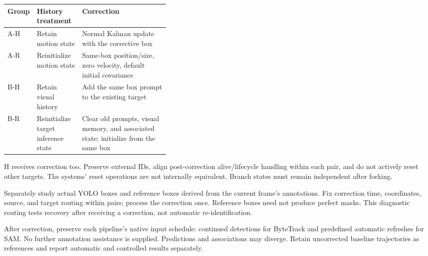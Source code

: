 \documentclass{article}
\begin{document}
\begin{center}
\begin{tabularx}{\linewidth}{@{}p{0.10\linewidth}p{0.28\linewidth}X@{}}
\toprule

Group & History treatment & Correction \\

\midrule

A-H & Retain motion state & Normal Kalman update with the corrective box \\

\addlinespace[3pt]

A-R & Reinitialize motion state & Same-box position/size, zero velocity, default initial covariance \\

\addlinespace[3pt]

B-H & Retain visual history & Add the same box prompt to the existing target \\

\addlinespace[3pt]

B-R & Reinitialize target inference state & Clear old prompts, visual memory, and associated state; initialize from the same box \\

\bottomrule

\end{tabularx}

\end{center}

H receives correction too. Preserve external IDs, align post-correction alive/lifecycle handling within each pair, and do not actively reset other targets. The systems' reset operations are not internally equivalent. Branch states must remain independent after forking.

Separately study actual YOLO boxes and reference boxes derived from the current frame's annotations. Fix correction time, coordinates, source, and target routing within pairs; process the correction once. Reference boxes need not produce perfect masks. This diagnostic routing tests recovery after receiving a correction, not automatic re-identification.

After correction, preserve each pipeline's native input schedule: continued detections for ByteTrack and predefined automatic refreshes for SAM. No further annotation assistance is supplied. Predictions and associations may diverge. Retain uncorrected baseline trajectories as references and report automatic and controlled results separately.
\end{document}
